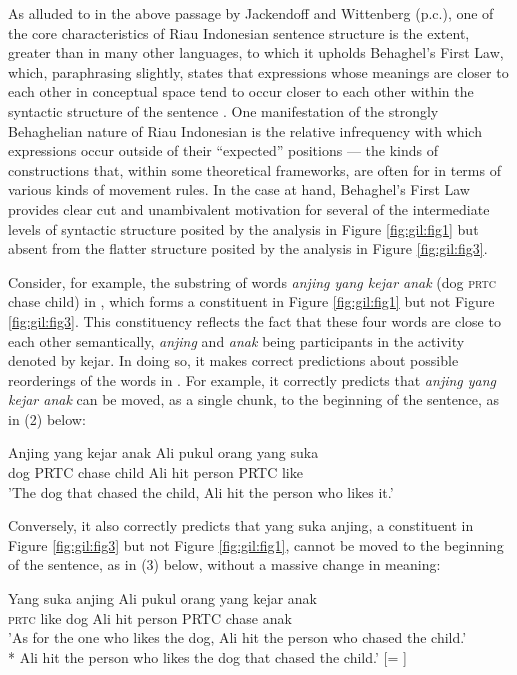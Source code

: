 \documentclass[output=paper,colorlinks,citecolor=brown
]{langscibook}
\begin{document}
As alluded to in the above passage by Jackendoff and Wittenberg (p.c.), one of the core characteristics of Riau Indonesian sentence structure is the extent, greater than in many other languages, to which it upholds Behaghel's First Law, which, paraphrasing slightly, states that expressions whose meanings are closer to each other in conceptual space tend to occur closer to each other within the syntactic structure of the sentence \citep{behaghel1932deutsche}.  One manifestation of the strongly Behaghelian nature of Riau Indonesian is the relative infrequency with which expressions occur outside of their ``expected'' positions — the kinds of constructions that, within some theoretical frameworks, are often for in terms of various kinds of movement rules.  In the case at hand, Behaghel's First Law provides clear cut and unambivalent motivation for several of the intermediate levels of syntactic structure posited by the analysis in Figure \ref{fig:gil:fig1} but absent from the flatter structure posited by the analysis in Figure \ref{fig:gil:fig3}.

Consider, for example, the substring of words \emph{anjing yang kejar anak} (dog \textsc{prtc} chase child) in , which forms a constituent in Figure \ref{fig:gil:fig1} but not Figure \ref{fig:gil:fig3}.  This constituency reflects the fact that these four words are close to each other semantically, \emph{anjing} and \emph{anak} being participants in the activity denoted by kejar.  In doing so, it makes correct predictions about possible reorderings of the words in .  For example, it correctly predicts that \emph{anjing yang kejar anak} can be moved, as a single chunk, to the beginning of the sentence, as in (2) below:

\ea
\gll Anjing	yang	kejar	anak	Ali	pukul	orang	yang	suka\\
 dog	PRTC	chase	child	Ali	hit	person	PRTC	like	\\
\glt 'The dog that chased the child, Ali hit the person who likes it.'
\z

Conversely, it also correctly predicts that yang suka anjing, a constituent in Figure \ref{fig:gil:fig3} but not Figure \ref{fig:gil:fig1}, cannot be moved to the beginning of the sentence, as in (3) below, without a massive change in meaning:

\ea
\gll Yang	suka	anjing	Ali	pukul	orang	yang	kejar	anak\\
 \textsc{prtc}	like	dog	Ali	hit	person	PRTC	chase	anak\\
\glt 'As for the one who likes the dog, Ali hit the person who chased the child.' \\
*	Ali hit the person who likes the dog that chased the child.' [= ]
\z
\end{document}
